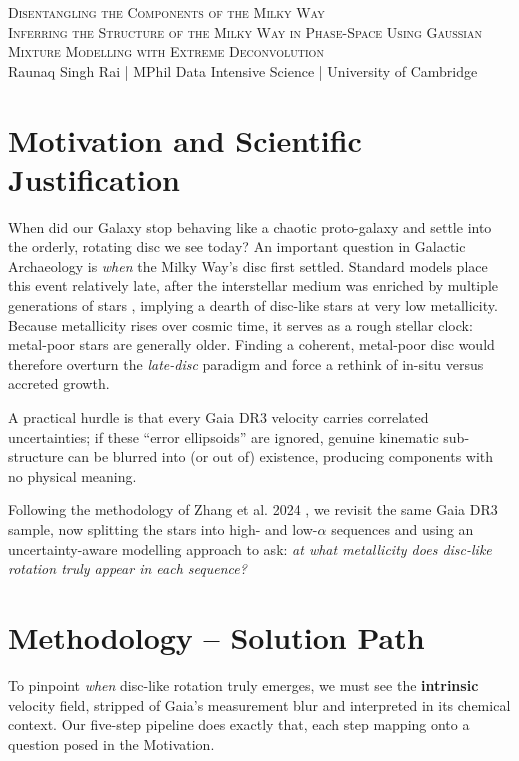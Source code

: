 \documentclass[a4paper,10pt]{article}
\begin{document}
\begin{center}
    {\Large \textsc{Disentangling the Components of the Milky Way}}\\[0.2cm]
    {\textsc{Inferring the Structure of the Milky Way in Phase-Space Using Gaussian Mixture Modelling with Extreme Deconvolution}}\\[0.2cm]
    Raunaq Singh Rai \quad | \quad MPhil Data Intensive Science \quad | \quad University of Cambridge
\end{center}

\begin{multicols}{2}

\section*{Motivation and Scientific Justification}

When did our Galaxy stop behaving like a chaotic proto-galaxy and settle into the orderly,
rotating disc we see today?  An important question in Galactic Archaeology is
\emph{when} the Milky Way’s disc first settled.  Standard models place this event
relatively late, after the interstellar medium was enriched by multiple generations of
stars \cite{Sestito2020,Gurvich2023}, implying a dearth of disc-like stars at very low
metallicity.  Because metallicity rises over cosmic time, it serves as a rough stellar
clock: metal-poor stars are generally older.  Finding a coherent, metal-poor disc would
therefore overturn the \emph{late-disc} paradigm and force a rethink of in-situ versus
accreted growth.

A practical hurdle is that every Gaia DR3 velocity carries correlated uncertainties; if
these “error ellipsoids” are ignored, genuine kinematic sub-structure can be blurred
into (or out of) existence, producing components with no physical meaning.  

Following the methodology of Zhang et al. 2024 \cite{zhang2024existencemetalpoordiscmilky}, 
we revisit the same Gaia DR3 sample, now splitting the stars into high- and
low-$\alpha$ sequences \cite{Vis2024} and using an uncertainty-aware modelling approach
to ask: \emph{at what metallicity does disc-like rotation truly appear in each
sequence?}


\section*{Methodology – Solution Path}

To pinpoint \emph{when} disc-like rotation truly emerges, we must see the
\textbf{intrinsic} velocity field, stripped of Gaia’s measurement blur and
interpreted in its chemical context.  Our five-step pipeline does exactly that,
each step mapping onto a question posed in the Motivation.


\end{multicols}
\end{document}
